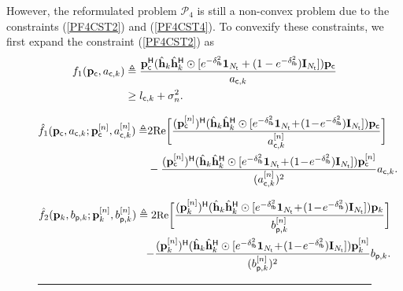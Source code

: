 \documentclass[draftclsnofoot, onecolumn, comsoc, 12pt]{IEEEtran}
\begin{document}
However, the reformulated problem $\mathscr{P}_4$ is still a non-convex problem {due to} the constraints (\ref{PF4CST2}) and (\ref{PF4CST4}). To convexify these constraints, we first expand the constraint (\ref{PF4CST2}) as 
\begin{align}\label{C_SINR_Eq}
f_{1}{(\mathbf{p_{\sf{c}}}, a_{{\sf{c}},k})} & \triangleq \frac{\mathbf{p}_{\sf{c}}^{\sf{H}}(\hat{\mathbf{h}}_{k} \hat{\mathbf{h}}_{k}^{\sf{H}} \odot
    [e^{-\delta_{\sf{fb}}^{2}}\mathbf{1}_{N_{{\sf{t}}}} + (1-e^{-\delta_{\sf{fb}}^{2}})\mathbf{I}_{N_{{\sf{t}}}}])\mathbf{p}_{\sf{c}}}
    {a_{{\sf{c}},k}} 
    \nonumber \\
    & \geq l_{{\sf{c}},k} + \sigma_{n}^{2}.
\end{align}

\begin{figure*}[!t]
\begin{align}\label{C_SCA_Eq}
\small
\hat{f}_{1}{(\mathbf{p}_{\sf{c}}, a_{{\sf{c}},k} ; \mathbf{p}_{\sf{c}}^{[n]}, a_{{\sf{c}},k}^{[n]})}  \triangleq 
&2\text{Re}\bigg[\frac{(\mathbf{p}_{\sf{c}}^{[n]})^{\sf{H}}(\hat{\mathbf{h}}_{k} \hat{\mathbf{h}}_{k}^{\sf{H}} \odot[e^{-\delta_{\sf{fb}}^{2}}\mathbf{1}_{N_{{\sf{t}}}}\! +\! (1\!-\!e^{-\delta_{\sf{fb}}^{2}})\mathbf{I}_{N_{{\sf{t}}}}])\mathbf{p}_{\sf{c}}}{a_{{\sf{c}},k}^{[n]}}\bigg]  \nonumber \\
& - \frac{(\mathbf{p}_{\sf{c}}^{[n]})^{\sf{H}}(\hat{\mathbf{h}}_{k} \hat{\mathbf{h}}_{k}^{\sf{H}} \odot[e^{-\delta_{\sf{fb}}^{2}}\mathbf{1}_{N_{{\sf{t}}}}\! +\! (1\!-\!e^{-\delta_{\sf{fb}}^{2}})\mathbf{I}_{N_{{\sf{t}}}}])\mathbf{p}_{\sf{c}}^{[n]}}{(a_{{\sf{c}},k}^{[n]})^2} a_{{\sf{c}},k}.
\end{align}
\vspace{-7mm}
\end{figure*}
\begin{figure*}[!t]
\begin{align} \label{P_SCA_Eq}
\small
\hat{f}_{2}{(\mathbf{p}_{k}, b_{{\sf{p}},k} ; \mathbf{p}_{k}^{[n]}, b_{{\sf{p}},k}^{[n]})}    \triangleq
2\text{Re}\bigg[\frac{(\mathbf{p}_{k}^{[n]})^{\sf{H}}(\hat{\mathbf{h}}_{k} \hat{\mathbf{h}}_{k}^{\sf{H}} \odot[e^{-\delta_{\sf{fb}}^{2}}\mathbf{1}_{N_{{\sf{t}}}}\! +\! (1\!-\!e^{-\delta_{\sf{fb}}^{2}})\mathbf{I}_{N_{{\sf{t}}}}])\mathbf{p}_{k}}{b_{{\sf{p}},k}^{[n]}}\bigg] \nonumber \\
- \frac{(\mathbf{p}_{k}^{[n]})^{\sf{H}}(\hat{\mathbf{h}}_{k} \hat{\mathbf{h}}_{k}^{\sf{H}} \odot[e^{-\delta_{\sf{fb}}^{2}}\mathbf{1}_{N_{{\sf{t}}}}\! +\! (1\!-\!e^{-\delta_{\sf{fb}}^{2}})\mathbf{I}_{N_{{\sf{t}}}}])\mathbf{p}_{k}^{[n]}}{(b_{{\sf{p}},k}^{[n]})^2} b_{{\sf{p}},k}.
\end{align}
\noindent\rule{\textwidth}{.5pt}%
\end{figure*}
\end{document}
